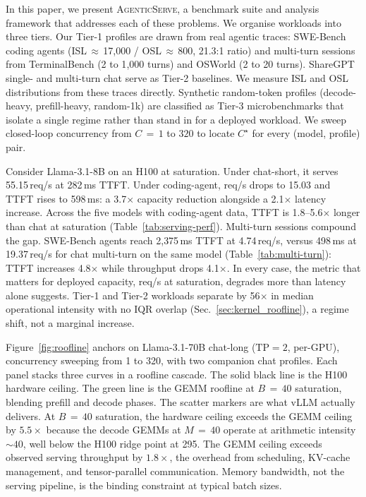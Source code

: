 In this paper, we present \textsc{AgenticServe}, a benchmark suite and analysis framework that addresses each of these problems. We organise workloads into three tiers. Our Tier-1 profiles are drawn from real agentic traces: SWE-Bench~\citep{swebench} coding agents (ISL\,$\approx$\,17{,}000 / OSL\,$\approx$\,800, 21.3:1 ratio) and multi-turn sessions from TerminalBench (2 to 1{,}000 turns) and OSWorld (2 to 20 turns). ShareGPT single- and multi-turn chat serve as Tier-2 baselines. We measure ISL and OSL distributions from these traces directly. Synthetic random-token profiles (decode-heavy, prefill-heavy, random-1k) are classified as Tier-3 microbenchmarks that isolate a single regime rather than stand in for a deployed workload. We sweep closed-loop concurrency from $C\,{=}\,1$ to $320$ to locate $C^{\star}$ for every (model, profile) pair.

Consider Llama-3.1-8B on an H100 at saturation. Under chat-short, it serves 55.15\,req/s at 282\,ms TTFT. Under coding-agent, req/s drops to 15.03 and TTFT rises to 598\,ms: a 3.7$\times$ capacity reduction alongside a 2.1$\times$ latency increase. Across the five models with coding-agent data, TTFT is 1.8--5.6$\times$ longer than chat at saturation (Table~\ref{tab:serving-perf}). Multi-turn sessions compound the gap. SWE-Bench agents reach 2{,}375\,ms TTFT at 4.74\,req/s, versus 498\,ms at 19.37\,req/s for chat multi-turn on the same model (Table~\ref{tab:multi-turn}): TTFT increases 4.8$\times$ while throughput drops 4.1$\times$. In every case, the metric that matters for deployed capacity, req/s at saturation, degrades more than latency alone suggests. Tier-1 and Tier-2 workloads separate by 56$\times$ in median operational intensity with no IQR overlap (Sec.~\ref{sec:kernel_roofline}), a regime shift, not a marginal increase.

Figure~\ref{fig:roofline} anchors on Llama-3.1-70B chat-long ($\text{TP}=2$, per-GPU), concurrency sweeping from 1 to 320, with two companion chat profiles. Each panel stacks three curves in a roofline cascade. The solid black line is the H100 hardware ceiling. The green line is the GEMM roofline at $B\,{=}\,40$ saturation, blending prefill and decode phases. The scatter markers are what vLLM actually delivers. At $B\,{=}\,40$ saturation, the hardware ceiling exceeds the GEMM ceiling by $5.5\times$ because the decode GEMMs at $M\,{=}\,40$ operate at arithmetic intensity ${\sim}40$, well below the H100 ridge point at 295. The GEMM ceiling exceeds observed serving throughput by $1.8\times$, the overhead from scheduling, KV-cache management, and tensor-parallel communication. Memory bandwidth, not the serving pipeline, is the binding constraint at typical batch sizes.

